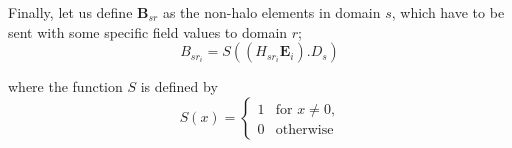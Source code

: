 \documentclass[11pt]{article}
\begin{document}
Finally, let us define $\pmb{B}_{sr}$ as the non-halo elements in
domain $s$, which have to be sent with some specific field values to
domain $r$;
\begin{equation}
B_{sr_i} = S( (H_{sr_i}\pmb{E}_i ).D_s )
\end{equation}

where the function $S$ is defined by
\begin{displaymath}
S(x) = \left\{ \begin{array}{ll}
1 & \textrm{for $x \ne 0$,}\\
0 & \textrm{otherwise}
\end{array} \right.
\end{displaymath}
\end{document}
